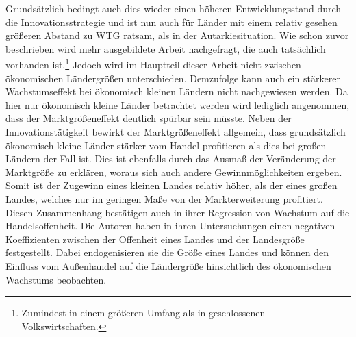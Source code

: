 Grunds{\"a}tzlich bedingt auch dies wieder einen h{\"o}heren Entwicklungsstand durch die Innovationsstrategie und ist nun auch f{\"u}r L{\"a}nder mit einem relativ gesehen gr{\"o}{\ss}eren Abstand zu WTG ratsam, als in der Autarkiesituation. Wie schon zuvor beschrieben wird mehr ausgebildete Arbeit nachgefragt, die auch tats{\"a}chlich vorhanden ist.\footnote{Zumindest in einem gr{\"o}{\ss}eren Umfang als in geschlossenen Volkswirtschaften.} Jedoch wird im Hauptteil dieser Arbeit nicht zwischen {\"o}konomischen L{\"a}ndergr{\"o}{\ss}en unterschieden. Demzufolge kann auch ein st{\"a}rkerer Wachstumseffekt bei {\"o}konomisch kleinen L{\"a}ndern nicht nachgewiesen werden. Da hier nur {\"o}konomisch kleine L{\"a}nder betrachtet werden wird lediglich angenommen, dass der Marktgr{\"o}{\ss}eneffekt deutlich sp{\"u}rbar sein m{\"u}sste. Neben der Innovationst{\"a}tigkeit bewirkt der Marktgr{\"o}{\ss}eneffekt allgemein, dass grunds{\"a}tzlich {\"o}konomisch kleine L{\"a}nder st{\"a}rker  vom Handel profitieren als dies bei gro{\ss}en L{\"a}ndern der Fall ist. Dies ist ebenfalls durch das Ausma{\ss} der Ver{\"a}nderung der Marktgr{\"o}{\ss}e zu erkl{\"a}ren, woraus sich auch andere Gewinnm{\"o}glichkeiten ergeben. Somit ist der Zugewinn eines kleinen Landes relativ h{\"o}her, als der eines gro{\ss}en Landes, welches nur im geringen Ma{\ss}e von der Markt\-erweiterung profitiert. \newline Diesen Zusammenhang best{\"a}tigen auch \citet{Alesina.2005} in ihrer Regression von Wachstum auf die Handelsoffenheit. Die Autoren haben in ihren Untersuchungen einen negativen Koeffizienten zwischen der Offenheit eines Landes und der Landesgr{\"o}{\ss}e festgestellt. Dabei endogenisieren sie die Gr{\"o}{\ss}e eines Landes und k{\"o}nnen den Einfluss vom Au{\ss}enhandel auf die L{\"a}ndergr{\"o}{\ss}e hinsichtlich des {\"o}konomischen Wachstums beobachten.\newline


